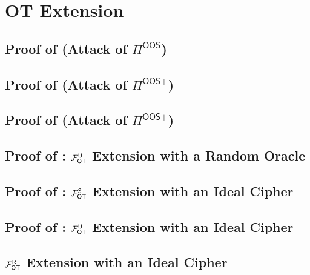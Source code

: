 
\section{OT Extension }\label{sec:extApp}


\iffullversion
\else



\subsection{Proof of  (Attack of $\Pi^\textsf{OOS}$)}



\subsection{Proof of  (Attack of $\Pi^\textsf{OOS+}$)}



\subsection{Proof of  (Attack of $\Pi^\textsf{OOS+}$)}


\subsection{Proof of : $\mathcal{F}_{\mathsf{OT}}^\mathsf{U}$ Extension with a Random Oracle}



\subsection{Proof of : $\mathcal{F}_{\mathsf{OT}}^\mathsf{S}$ Extension with an Ideal Cipher}



\subsection{Proof of :  $\mathcal{F}_{\mathsf{OT}}^\mathsf{U}$ Extension with an Ideal Cipher}




\subsection{ $\mathcal{F}_{\mathsf{OT}}^\mathsf{R}$ Extension with an Ideal Cipher}

